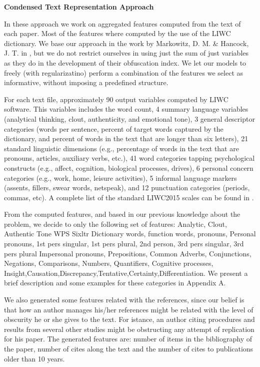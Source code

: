 \documentclass[12pt]{article}
\begin{document}
\textbf{Condensed Text Representation Approach}

In these approach we work on aggregated features computed from the text of each paper. Most of the features where computed by the use of the LIWC dictionary. We base our approach in the work by Markowitz, D. M. \& Hancock, J. T. in \cite{prev2}, but we do not restrict ourselves in using just the sum of just variables as they do in the development of their obfuscation index. We let our models to freely (with regularizatino) perform a combination of the features we select as informative, without imposing a predefined structure. 

For each text file, approximately 90 output variables computed by LIWC software. This variables includes the word count, 4 summary language variables (analytical thinking, clout, authenticity, and emotional tone), 3 general descriptor categories
(words per sentence, percent of target words captured by the dictionary, and percent of words in the text that are longer than six letters), 21 standard linguistic dimensions (e.g., percentage of words in the text that are pronouns, articles, auxiliary verbs, etc.), 41 word categories tapping psychological constructs (e.g., affect, cognition, biological processes, drives), 6 personal concern categories (e.g., work, home, leisure activities), 5 informal language markers (assents, fillers, swear words, netspeak), and 12 punctuation categories (periods, commas, etc). A complete list of the standard LIWC2015 scales can be found in \cite{LIWC2}.

From the computed features, and based in our previous knowledge about the problem, we decide to only the following set of features: Analytic, Clout, Authentic Tone WPS Sixltr Dictionary words, function words, pronouns, Personal pronouns, 1st pers singular, 1st pers plural, 2nd person, 3rd pers singular, 3rd pers plural
Impersonal pronouns, Prepositions, Common Adverbs, Conjunctions, Negations, Comparisons, Numbers, Quantifiers, Cognitive processes, Insight,Causation,Discrepancy,Tentative,Certainty,Differentiation. We present a brief description and some examples for these categories in Appendix A. 

We also generated some features related with the references, since our belief is that how an author manages his/her references might be related with the level of obscurity he or she gives to the text. For istance, an author citing procedures and results from several other studies might be obstructing any attempt of replication for his paper. The generated features are: number of items in the bibliography of the paper, number of cites along the text and the number of cites to publications older than 10 years. 
\end{document}
